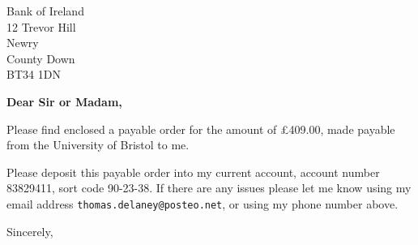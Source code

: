 \documentclass[10pt]{letter} %
\begin{document}

\begin{letter}{Bank of Ireland \\ 12 Trevor Hill \\ Newry \\ County Down \\ BT34 1DN} %


\opening{\textbf{Dear Sir or Madam,}}

Please find enclosed a payable order for the amount of \pounds 409.00, made payable from the University of Bristol to me.

Please deposit this payable order into my current account, account number 83829411, sort code 90-23-38. If there are any issues please let me know using my email address \texttt{thomas.delaney@posteo.net}, or using my phone number above.

\vspace{2\parskip} %
\closing{Sincerely,}
\vspace{2\parskip} %

%


\end{letter}
\end{document}
